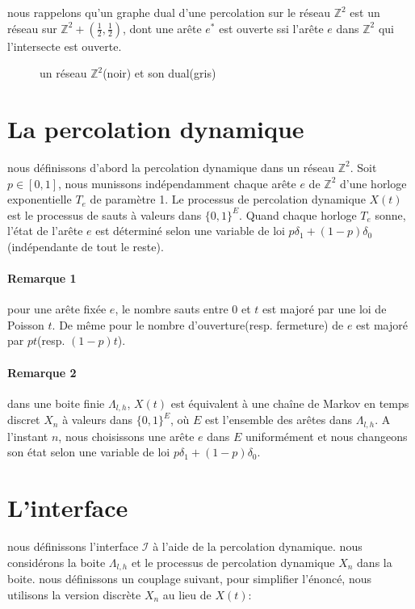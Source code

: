 \documentclass[titlepage,a4paper,12pt]{article}
\begin{document}
nous rappelons qu'un graphe dual d'une percolation sur le réseau $\mathbb{Z}^2$ est un réseau sur $\mathbb{Z}^2+(\frac{1}{2},\frac{1}{2})$, dont une arête $e^*$ est ouverte ssi l'arête $e$ dans $\mathbb{Z}^2$ qui l'intersecte est ouverte.

\begin{figure}[h]
\center
{}
\caption{un réseau $\mathbb{Z}^2$(noir) et son dual(gris)}
\end{figure}

\section{La percolation dynamique}
nous définissons d'abord la percolation dynamique dans un réseau $\mathbb{Z}^2$. 
Soit $p\in [0,1]$, nous munissons indépendamment chaque arête $e$ de $\mathbb{Z}^2$ d'une horloge exponentielle $T_e$ de paramètre 1. Le processus de percolation dynamique $X(t)$ est le processus de sauts à valeurs dans $\{0,1\}^E$. Quand chaque horloge $T_e$ sonne, l'état de l'arête $e$ est déterminé selon une variable de loi $p\delta_1+(1-p)\delta_0$ (indépendante de tout le reste). 

\paragraph{Remarque 1} pour une arête fixée $e$, le nombre sauts entre $0$ et $t$ est majoré par une loi de Poisson $t$. De même pour le nombre d'ouverture(resp. fermeture) de $e$ est majoré par $pt$(resp. $(1-p)t$).

\paragraph{Remarque 2} dans une boite finie $\Lambda_{l,h}$,  $X(t)$ est équivalent à une chaîne de Markov en temps discret $X_n$ à valeurs dans $\{0,1\}^E$, où $E$ est l'ensemble des arêtes dans $\Lambda_{l,h}$. A l'instant $n$, nous choisissons une arête $e$ dans $E$ uniformément et nous changeons son état selon une variable de loi $p\delta_1 +(1-p)\delta_0$. 

\section{L'interface}
nous définissons l'interface $\mathcal{I}$ à l'aide de la percolation dynamique. nous considérons la boite $\Lambda_{l,h}$ et le processus de percolation dynamique $X_n$ dans la boite. nous définissons un couplage suivant, pour simplifier l'énoncé, nous utilisons la version discrète $X_n$ au lieu de $X(t)$:
\end{document}
